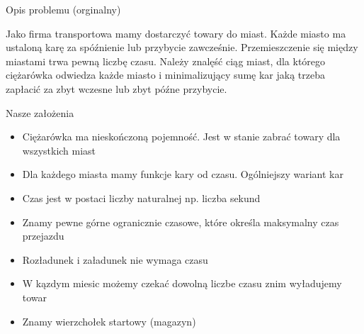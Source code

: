\begin{frame}{Opis problemu (orginalny)}
	
	Jako firma transportowa mamy dostarczyć towary do miast. 
	Każde miasto ma ustaloną karę za spóźnienie lub przybycie zawcześnie. 
	Przemieszczenie się między miastami trwa pewną liczbę czasu.
	Należy znalęść ciąg miast, dla którego ciężarówka odwiedza każde miasto i minimalizujący sumę kar jaką trzeba zapłacić za zbyt wczesne lub zbyt późne przybycie.
	
\end{frame}

\begin{frame}{Nasze założenia}

	\begin{itemize}
		\item Ciężarówka ma nieskończoną pojemność. Jest w stanie zabrać towary dla wszystkich miast
		\item Dla każdego miasta mamy funkcje kary od czasu. Ogólniejszy wariant kar
		\item Czas jest w postaci liczby naturalnej np. liczba sekund
		\item Znamy pewne górne ogranicznie czasowe, które określa maksymalny czas przejazdu			   
		\item Rozładunek i załadunek nie wymaga czasu
		\item W kązdym miesic możemy czekać dowolną liczbe czasu znim wyładujemy towar
		\item Znamy wierzchołek startowy (magazyn)
	\end{itemize}

\end{frame}